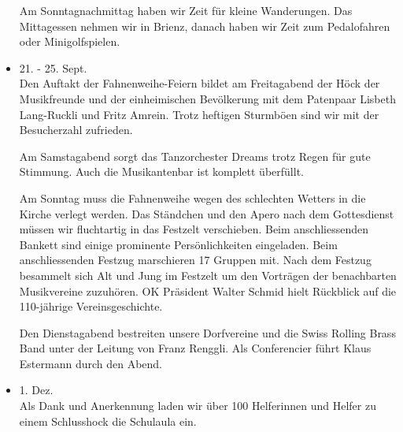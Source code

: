 \begin{history}
\begin{itemize}
        Am Sonntagnachmittag haben wir Zeit für kleine Wanderungen. Das
        Mittagessen nehmen wir in Brienz, danach haben wir Zeit zum Pedalofahren
        oder Minigolfspielen.

        \item[]21. - 25. Sept.\\
        Den Auftakt der Fahnenweihe-Feiern bildet am Freitagabend der Höck der
        Musikfreunde und der einheimischen Bevölkerung mit dem Patenpaar Lisbeth
        Lang-Ruckli und Fritz Amrein. Trotz heftigen Sturmböen sind wir mit der
        Besucherzahl zufrieden.

        Am Samstagabend sorgt das Tanzorchester Dreams trotz Regen für gute
        Stimmung. Auch die Musikantenbar ist komplett überfüllt.

        Am Sonntag muss die Fahnenweihe wegen des schlechten Wetters in die
        Kirche verlegt werden. Das Ständchen und den Apero nach dem Gottesdienst
        müssen wir fluchtartig in das Festzelt verschieben. Beim anschliessenden
        Bankett sind einige prominente Persönlichkeiten eingeladen. Beim
        anschliessenden Festzug marschieren 17 Gruppen mit. Nach dem Festzug
        besammelt sich Alt und Jung im Festzelt um den Vorträgen der
        benachbarten Musikvereine zuzuhören. OK Präsident Walter Schmid hielt
        Rückblick auf die 110-jährige Vereinsgeschichte.

        Den Dienstagabend bestreiten unsere Dorfvereine und die Swiss Rolling
        Brass Band unter der Leitung von Franz Renggli. Als Conferencier führt
        Klaus Estermann durch den Abend.

        \item[]1. Dez.\\
        Als Dank und Anerkennung laden wir über 100 Helferinnen und Helfer zu
        einem Schlusshock die Schulaula ein.

    \end{itemize}

\end{history}
